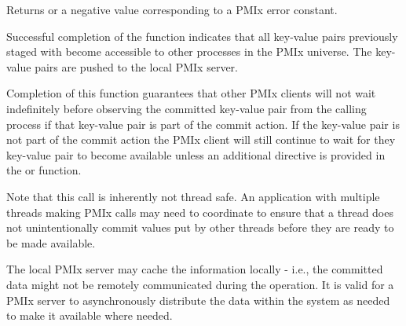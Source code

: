 Returns  or a negative value corresponding to a PMIx error constant.

\descr

Successful completion of the  function indicates that all key-value pairs previously staged with  become accessible to other processes in the \ac{PMIx} universe.
The key-value pairs are pushed to the local \ac{PMIx} server.

Completion of this function guarantees that other \ac{PMIx} clients will not wait indefinitely before observing the committed key-value pair from the calling process if that key-value pair is part of the commit action.
If the key-value pair is not part of the commit action the \ac{PMIx} client will still continue to wait for they key-value pair to become available unless an additional directive is provided in the  or  function.

%
%


\adviceuserstart
Note that this call is inherently not thread safe.  An application with multiple threads making PMIx calls
may need to coordinate to ensure that a thread does not unintentionally commit values put by other threads before
they are ready to be made available.
\adviceuserend

\adviceimplstart
The local \ac{PMIx} server may cache the information locally - i.e., the committed data might not be 
remotely communicated during the  operation.
%
It is valid for a \ac{PMIx} server to asynchronously distribute the data within the system as needed to make it available where needed.  
\adviceimplend


